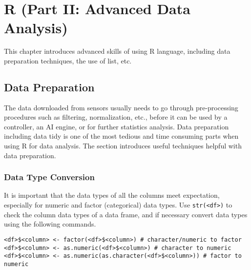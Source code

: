 \chapter{R (Part II: Advanced Data Analysis)} \label{ch:r2}

This chapter introduces advanced skills of using R language, including data preparation techniques, the use of list, etc.

\section{Data Preparation} \label{ch:r2:sec:datapreparation}

The data downloaded from sensors usually needs to go through pre-processing procedures such as filtering, normalization, etc., before it can be used by a controller, an AI engine, or for further statistics analysis. Data preparation including data tidy is one of the most tedious and time consuming parts when using R for data analysis. The section introduces useful techniques helpful with data preparation.

\subsection{Data Type Conversion}

It is important that the data types of all the columns meet expectation, especially for numeric and factor (categorical) data types. Use \verb|str(<df>)| to check the column data types of a data frame, and if necessary convert data types using the following commands.
\begin{lstlisting}
<df>$<column> <- factor(<df>$<column>) # character/numeric to factor
<df>$<column> <- as.numeric(<df>$<column>) # character to numeric
<df>$<column> <- as.numeric(as.character(<df>$<column>)) # factor to numeric
\end{lstlisting}

